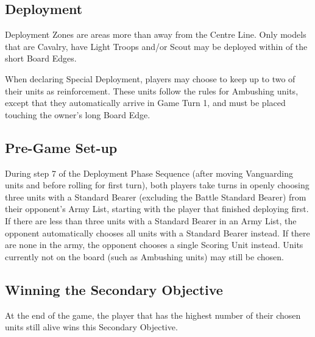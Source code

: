 
\label{Despoilers}


\subsection*{Deployment}

Deployment Zones are areas more than  away from the Centre Line. Only models that are Cavalry, have Light Troops and/or Scout may be deployed within  of the short Board Edges.

When declaring Special Deployment, players may choose to keep up to two of their units as reinforcement. These units follow the rules for Ambushing units, except that they automatically arrive in Game Turn 1, and must be placed touching the owner's long Board Edge.


\subsection*{Pre-Game Set-up}

During step 7 of the Deployment Phase Sequence (after moving Vanguarding units and before rolling for first turn), both players take turns in openly choosing three units with a Standard Bearer (excluding the Battle Standard Bearer) from their opponent's Army List, starting with the player that finished deploying first. If there are less than three units with a Standard Bearer in an Army List, the opponent automatically chooses all units with a Standard Bearer instead. If there are none in the army, the opponent chooses a single Scoring Unit instead. Units currently not on the board (such as Ambushing units) may still be chosen.

\subsection*{Winning the Secondary Objective}

At the end of the game, the player that has the highest number of their chosen units still alive wins this Secondary Objective.
